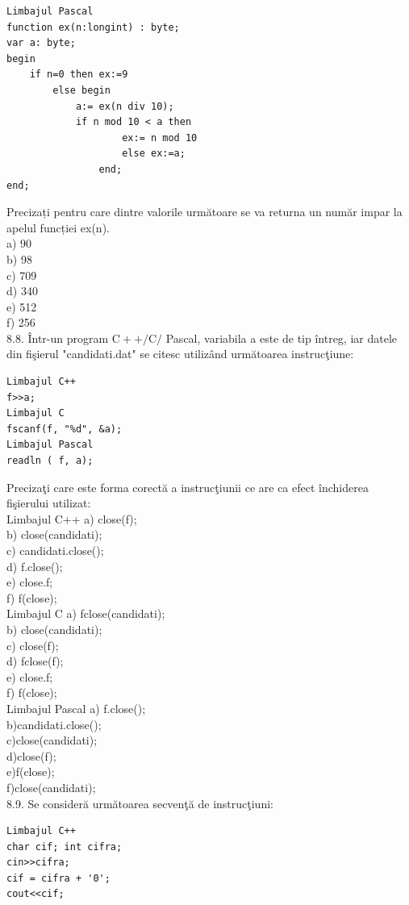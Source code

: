 \begin{verbatim}
Limbajul Pascal
function ex(n:longint) : byte;
var a: byte;
begin
    if n=0 then ex:=9
        else begin
            a:= ex(n div 10);
            if n mod 10 < a then
                    ex:= n mod 10
                    else ex:=a;
                end;
end;
\end{verbatim}
Precizați pentru care dintre valorile următoare se va returna un număr impar la apelul funcției ex(n).
\\
a) 90
\\
b) 98
\\
c) 709
\\
d) 340
\\
e) 512
\\
f) 256
\\
8.8. Într-un program $\mathrm{C}++/ \mathrm{C} /$ Pascal, variabila a este de tip întreg, iar datele din fişierul "candidati.dat" se citesc utilizând următoarea instrucţiune:
\begin{verbatim}
Limbajul C++
f>>a;
Limbajul C
fscanf(f, "%d", &a);
Limbajul Pascal
readln ( f, a);
\end{verbatim}
Precizaţi care este forma corectă a instrucţiunii ce are ca efect închiderea fişierului utilizat:
\\
Limbajul C++
a) close(f);
\\
b) close(candidati);
\\ 
c) candidati.close();
\\
d) f.close();
\\
e) close.f;
\\
f) f(close);
\\
Limbajul C
a) fclose(candidati);
\\ 
b) close(candidati);
\\
c) close(f);
\\
d) fclose(f);
\\
e) close.f;
\\
f) f(close);
\\
Limbajul Pascal
a) f.close();
\\
b)candidati.close();
\\
c)close(candidati);
\\
d)close(f);
\\
e)f(close);
\\
f)close(candidati);
\\
8.9. Se consideră următoarea secvenţă de instrucţiuni:
\begin{verbatim}
Limbajul C++
char cif; int cifra;
cin>>cifra;
cif = cifra + '0';
cout<<cif;
\end{verbatim}
